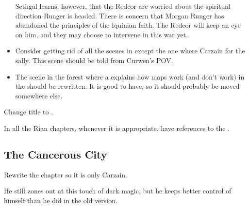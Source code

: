 \begin{garbage}
\begin{changes}
\begin{itemize}
        Sethgal learns, however, that the Redcor are worried about the spiritual direction Runger is headed. 
        There is concern that Morgan Runger has abandoned the principles of the Iquinian faith. 
        The Redcor will keep an eye on him, and they may choose to intervene in this war yet. 
        
      \item 
        Consider getting rid of all the scenes in \Forklin{} except the one where Carzain  for the sally. 
        This scene should be told from Curwen's POV. 
        
      \item 
        The scene in the forest where a \ranger{} explains how maps work (and don't work) in the \wylde{} should be rewritten. 
        It is good to have, so it should probably be moved somewhere else. 
    \end{itemize}
  
  \begin{comment}\paragraph{Trinity of Pestilences}\end{comment}
    Change title to . 
    
    In all the Rian chapters, whenever it is appropriate, have references to the . 
\end{changes}









\subsection{The Cancerous City}
\begin{changes}
  \begin{comment}
  \paragraph{The Terror of \EreshKal}
  \end{comment}
    Rewrite the chapter so it is only Carzain.
    
    He still zones out at this touch of dark magic, but he keeps better control of himself than he did in the old version. 
  

\end{changes}
\end{garbage}
